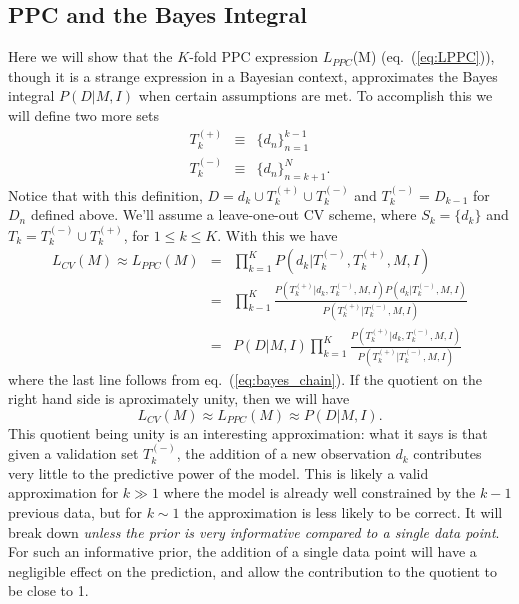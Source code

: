 \documentclass[12pt]{article}
\newcommand{\LCV}[1]{\ensuremath{L_{CV}}(#1)}
\newcommand{\LPPC}[1]{\ensuremath{L_{PPC}}(#1)}
\newcommand{\Tkplus}{\ensuremath{T_k^{(+)}}}
\newcommand{\Tkminus}{\ensuremath{T_k^{(-)}}}
\newcommand{\eqn}[1]{eq.~(\ref{eq:#1})}
\begin{document}
\subsection{PPC and the Bayes Integral}
Here we will show that the $K$-fold PPC expression \LPPC{M} (\eqn{LPPC}),
though it is a strange expression in a Bayesian context, approximates the
Bayes integral $P(D|M,I)$ when certain assumptions are met.
To accomplish this we will define two more sets
\begin{eqnarray}
  \Tkplus &\equiv& \{d_n\}_{n=1}^{k-1}\\
  \Tkminus &\equiv& \{d_n\}_{n=k+1}^N.
\end{eqnarray}
Notice that with this definition, $D = d_k \cup \Tkplus \cup \Tkminus$
and $\Tkminus = D_{k-1}$ for $D_n$ defined above.
We'll assume a leave-one-out CV scheme, where $S_k =\{d_k\}$
and $T_k = \Tkminus \cup \Tkplus$, for $1 \le k \le K$.  With this we
have
\begin{eqnarray}
  \LCV{M} \approx \LPPC{M} &=& \prod_{k=1}^K P(d_k|\Tkminus,\Tkplus,M,I)\\
         &=& \prod_{k-1}^K \frac{P(\Tkplus|d_k,\Tkminus,M,I) P(d_k|\Tkminus,M,I)}
                               {P(\Tkplus|\Tkminus,M,I)}\\
         &=& P(D|M,I) \prod_{k=1}^K \frac{P(\Tkplus|d_k,\Tkminus,M,I)}
                                        {P(\Tkplus|\Tkminus,M,I)}
\end{eqnarray}
where the last line follows from \eqn{bayes_chain}.
If the quotient on the right hand side is aproximately unity, then we will
have
\begin{equation}
  \LCV{M} \approx \LPPC{M} \approx P(D|M,I).
\end{equation}
This quotient being unity is an interesting approximation: what it says is that
given a validation set \Tkminus{}, the addition of a new observation $d_k$
contributes very little to the predictive power of the model.  This is likely
a valid approximation for $k \gg 1$ where the model is already well constrained
by the $k-1$ previous data, but for $k \sim 1$ the approximation is less
likely to be correct.  It will break down
{\it unless the prior is very informative compared to a single data point}.
For such an informative prior, the addition of a single data point will
have a negligible effect on the prediction, and allow the contribution to the
quotient to be close to 1.
\end{document}
